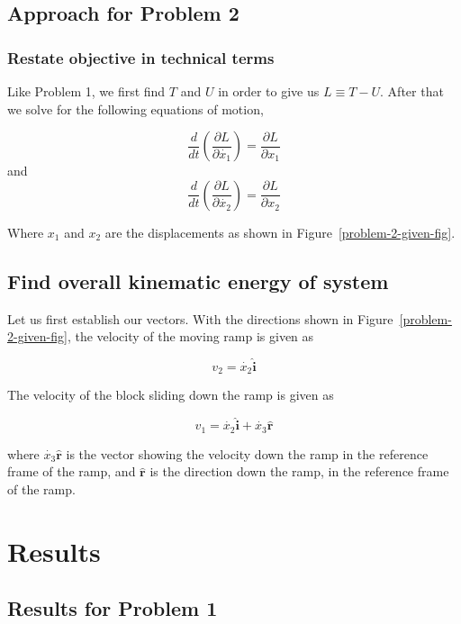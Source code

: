 \documentclass[conference]{IEEEtran}
\begin{document}
\subsection{Approach for Problem 2}

\subsubsection{Restate objective in technical terms}
Like Problem 1, we first find $T$ and $U$ in order to give us
$L \equiv T - U$. After that we solve for the following
equations of motion,

\begin{equation} \label{prob2_eq_motion_x1}
    \frac{d}{dt} \left(\frac{\partial L}{\partial \dot{x_1}}\right) = \frac{\partial L}{ \partial x_1}
\end{equation}
and
\begin{equation} \label{prob2_eq_motion_x2}
    \frac{d}{dt} \left(\frac{\partial L}{\partial \dot{x_2}}\right) = \frac{\partial L}{ \partial x_2}
\end{equation}

Where $x_1$ and $x_2$ are the displacements as shown in Figure~\ref{problem-2-given-fig}.

\subsection{Find overall kinematic energy of system}

Let us first establish our vectors. With the directions shown in Figure~\ref{problem-2-given-fig},
the velocity of the moving ramp is given as 

\[
    v_2 = \dot{x_2} \hat{\textbf{i}}
\]

The velocity of the block sliding down the ramp is given as

\[
    v_1 = \dot{x_2} \hat{\textbf{i}} + \dot{x_3}\hat{\textbf{r}}
\]

where $\dot{x_3}\hat{\textbf{r}}$ is the vector showing the velocity down the ramp in the reference frame of the
ramp, and $\hat{\textbf{r}}$ is the direction down the ramp, in the reference frame of the ramp.

\section{Results}

\subsection{Results for Problem 1}
\end{document}
